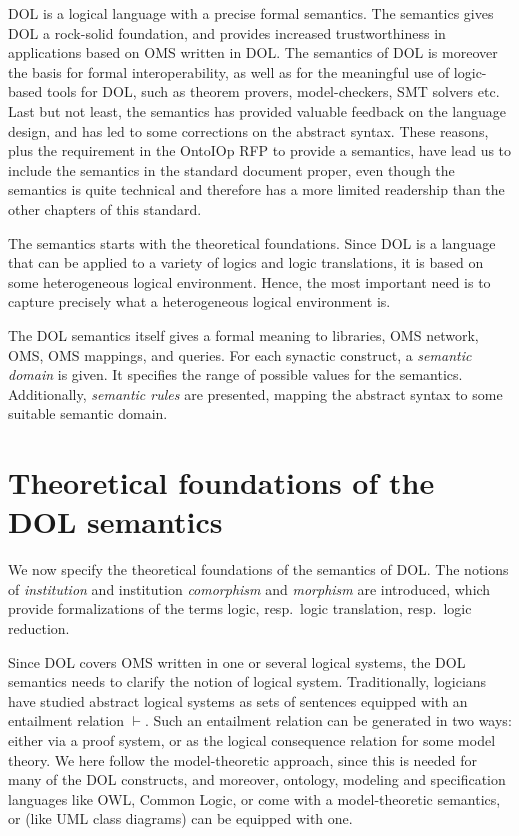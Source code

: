 \documentclass[10pt,fleqn,%
\ifpretendfinal
final%
\else
draft%
\fi,
]{scrreprt}
\newcommand*{\termref}[1]{\index{#1}#1\xspace}
\newcommand{\sclause}[1]{\section{#1}}
\begin{document}
DOL is a logical language with a precise formal semantics.  The
semantics gives DOL a rock-solid foundation, and provides increased
trustworthiness in applications based on OMS written in DOL.  The
semantics of DOL is moreover the basis for formal interoperability, as
well as for the meaningful use of logic-based tools for DOL, such as
theorem provers, model-checkers, SMT solvers etc.  Last but not least,
the semantics has provided valuable feedback on the language design,
and has led to some corrections on the abstract syntax.  These
reasons, plus the requirement in the OntoIOp RFP to provide a
semantics, have lead us to include the semantics in the standard
document proper, even though the semantics is quite technical and
therefore has a more limited readership than the other chapters of
this standard.

The semantics starts with the theoretical foundations. Since DOL is a
language that can be applied to a variety of logics and logic
translations, it is based on some heterogeneous logical environment.
Hence, the most important need is to capture precisely what a
heterogeneous logical environment is.

The DOL semantics itself gives a formal meaning to libraries, OMS
network, OMS, OMS mappings, and queries. For each synactic construct,
a \emph{semantic domain} is given. It specifies the range of possible
values for the semantics. Additionally, \emph{semantic rules} are
presented, mapping the abstract syntax to some suitable semantic
domain.

\sclause{Theoretical foundations of the DOL semantics}

We now specify the theoretical foundations of the semantics of DOL.
The notions of \emph{institution} and institution 
\emph{comorphism} and \emph{morphism} are introduced, which provide formalizations of the terms 
\termref{logic}, resp.\ \termref{logic translation}, resp.\  \termref{logic reduction}. 

Since DOL covers OMS written in one or several logical systems, the
DOL semantics needs to clarify the notion of logical
system. Traditionally, logicians have studied abstract logical systems
as sets of sentences equipped with an entailment relation
$\vdash$. Such an entailment relation can be generated in two ways:
either via a proof system, or as the logical consequence relation for
some model theory.  We here follow the model-theoretic approach, since
this is needed for many of the DOL constructs, and moreover, ontology,
modeling and specification languages like OWL, Common Logic, or \CASL
come with a model-theoretic semantics, or (like UML class diagrams)
can be equipped with one.
\end{document}
